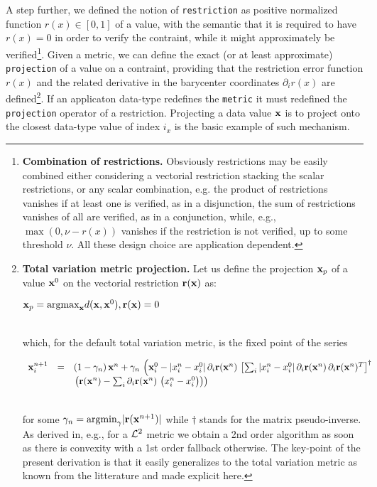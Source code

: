 \documentclass[a4,12pt]{article}
\newcommand{\eqline}[1]{\\\centerline{$#1$}\\}
\begin{document}
A step further, we defined the notion of {\tt restriction} as positive normalized function $r(x) \in [0, 1]$ of a value, with the semantic that it is required to have $r(x) = 0$ in order to verify the contraint, while it might approximately be verified\footnote{{\bf Combination of restrictions.} Obsviously restrictions may be easily combined either considering a vectorial restriction stacking the scalar restrictions, or any scalar combination, e.g. the product of restrictions vanishes if at least one is verified, as in a disjunction, the sum of restrictions vanishes of all are verified, as in a conjunction, while, e.g., $\max(0, \nu - r(x))$ vanishes if the restriction is not verified, up to some threshold $\nu$. All these design choice are application dependent.}. Given a metric, we can define the exact (or at least approximate) {\tt projection} of a value on a contraint, providing that the restriction error function $r(x)$ and the related derivative in the barycenter coordinates $\partial_i r(x)$ are defined\footnote{{\bf Total variation metric projection.} Let us define the projection ${\bf x}_p$ of a value ${\bf x}^0$ on the vectorial restriction ${\bf r}({\bf x})$ as:
\eqline{{\bf x}_p = \mbox{argmax}_{\bf x} d({\bf x}, {\bf x}^0), {\bf r}({\bf x}) = 0}
which, for the default total variation metric, is the fixed point of the series
\eqline{\begin{array}{rcl} {\bf x}^{n+1}_i &=& (1-\gamma_n) \, {\bf x}^{n} + \gamma_n \, \left({\bf x}^0_i - |x^{n}_i - x^0_i| \, \partial_i {\bf r}({\bf x}^{n}) \, \left[ \sum_i |x^{n}_i - x^0_i| \, \partial_i {\bf r}({\bf x}^{n}) \, \partial_i {\bf r}({\bf x}^{n})^T \right]^\dagger \, \right. \\ && \left. \left({\bf r}({\bf x}^{n}) - \sum_i \partial_i {\bf r}({\bf x}^{n}) \, \left(x^{n}_i - x^0_i\right)\right)\right) \\ \end{array}}
for some $\gamma_n = \mbox{argmin}_\gamma |{\bf r}({\bf x}^{n+1})|$ while $\dagger$ stands for the matrix pseudo-inverse. As derived in, e.g., \cite{vieville:inria-00074888} for a ${\cal L}^2$ metric we obtain a 2nd order algorithm as soon as there is convexity with a 1st order fallback otherwise. The key-point of the present derivation is that it easily generalizes to the total variation metric as known from the litterature and made explicit here.}. If an applicaton data-type redefines the {\tt metric} it must redefined the {\tt projection} operator of a restriction.
Projecting a data value ${\bf x}$ is to project onto the closest data-type value of index $i_x$ is the basic example of such mechanism.
\end{document}
